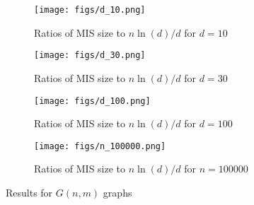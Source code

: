 \begin{figure}
    \centering
    \begin{subfigure}[b]{0.45\linewidth}
        \texttt{[image: figs/d\_10.png]}
        \caption{Ratios of MIS size to $n\ln(d)/d$ for $d=10$}
        \label{fig:d_10}
    \end{subfigure}
    \hfill
    \begin{subfigure}[b]{0.45\linewidth}
        \texttt{[image: figs/d\_30.png]}
        \caption{Ratios of MIS size to $n\ln(d)/d$ for $d=30$}
        \label{fig:d_30}
    \end{subfigure}
    \hfill
    \begin{subfigure}[b]{0.45\linewidth}
        \texttt{[image: figs/d\_100.png]}
        \caption{Ratios of MIS size to $n\ln(d)/d$ for $d=100$}
        \label{fig:d_100}
    \end{subfigure}
    \hfill
    \begin{subfigure}[b]{0.45\linewidth}
        \texttt{[image: figs/n\_100000.png]}
        \caption{Ratios of MIS size to $n\ln(d)/d$ for $n=100000$}
        \label{fig:n_100000}
    \end{subfigure}
    \caption{Results for $G(n,m)$ graphs}
    \label{fig:gnm}
\end{figure}
